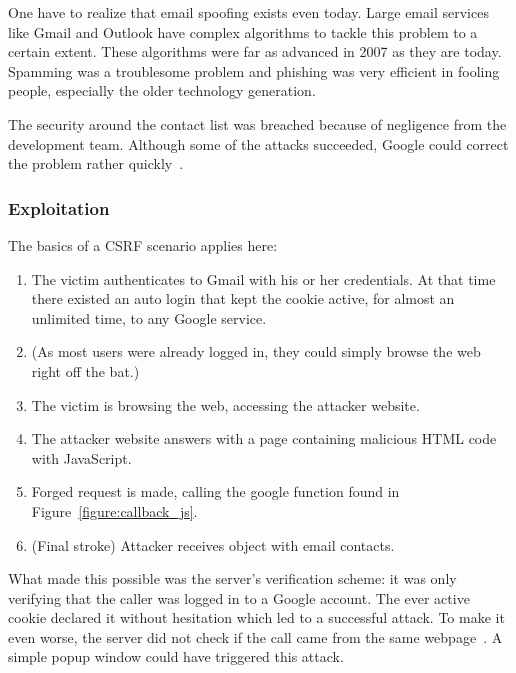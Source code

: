 \documentclass[a4paper,11pt,openany]{report}
\begin{document}
  One have to realize that email spoofing exists even today. Large email services like Gmail and Outlook have
  complex algorithms to tackle this problem to a certain extent. These algorithms were far as advanced in 2007 as 
  they are today. Spamming was a troublesome problem and phishing was very efficient in fooling people, especially 
  the older technology generation.
  
  The security around the contact list was breached because of negligence from the development team. Although
  some of the attacks succeeded, Google could correct the problem rather quickly~\cite{oreilly}.

  \subsubsection{Exploitation}
  The basics of a CSRF scenario applies here:
  \begin{enumerate}
   \itemsep0pt %
   \item The victim authenticates to Gmail with his or her credentials. At that time there existed an auto login
   that kept the cookie active, for almost an unlimited time, to any Google service.
   \item (As most users were already logged in, they could simply browse the web right off the bat.)
   \item The victim is browsing the web, accessing the attacker website. 
   \item The attacker website answers with a page containing malicious HTML code with JavaScript.
   \item Forged request is made, calling the google function found in Figure~\ref{figure:callback_js}.
   \item (Final stroke) Attacker receives object with email contacts. %
  \end{enumerate}
  
  What made this possible was the server's verification scheme: it was only verifying that the caller was logged in 
  to a Google account. The ever active cookie declared it without hesitation which led to a successful attack.
  To make it even worse, the server did not check if the call came from the same webpage~\cite{gmail_contact_list_csrf}. 
  A simple popup window could have triggered this attack.
  
\end{document}
